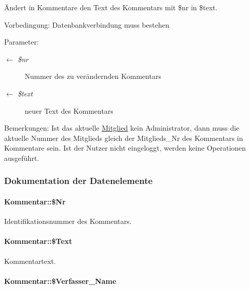 Ändert in Kommentare den Text des Kommentars mit \$nr in \$text. \begin{Desc}
\item[Vorbedingung:]Datenbankverbindung muss bestehen \end{Desc}
\begin{Desc}
\item[Parameter:]
\begin{description}
\item[\mbox{$\leftarrow$} {\em \$nr}]Nummer des zu verändernden Kommentars \item[\mbox{$\leftarrow$} {\em \$text}]neuer Text des Kommentars \end{description}
\end{Desc}
\begin{Desc}
\item[Bemerkungen:]Ist das aktuelle \hyperlink{classMitglied}{Mitglied} kein Administrator, dann muss die aktuelle Nummer des Mitglieds gleich der Mitglieds\_\-Nr des Kommentars in Kommentare sein. Ist der Nutzer nicht eingeloggt, werden keine Operationen ausgeführt. \end{Desc}


\subsubsection{Dokumentation der Datenelemente}
\hypertarget{classKommentar_1b0a3cfcb9fc7075f985cc8067ab1982}{
\paragraph[\$Nr]{\setlength{\rightskip}{0pt plus 5cm}Kommentar::\$Nr}\hfill}
\label{classKommentar_1b0a3cfcb9fc7075f985cc8067ab1982}


Identifikationsnummer des Kommentars. 

\hypertarget{classKommentar_c9a481413d6ba0c000719ad514bad4b5}{
\paragraph[\$Text]{\setlength{\rightskip}{0pt plus 5cm}Kommentar::\$Text}\hfill}
\label{classKommentar_c9a481413d6ba0c000719ad514bad4b5}


Kommentartext. 

\hypertarget{classKommentar_84f0fc10295968adde28169f8df018d9}{
\paragraph[\$Verfasser\_\-Name]{\setlength{\rightskip}{0pt plus 5cm}Kommentar::\$Verfasser\_\-Name}\hfill}
\label{classKommentar_84f0fc10295968adde28169f8df018d9}


